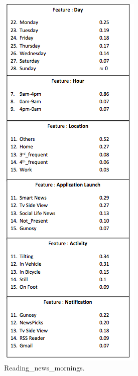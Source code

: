 \begin{figure}[t!]
\begin{subfigure}[t]{0.33\textwidth}
        \includegraphics[scale=0.51]{Figures/News.png}
        \caption{Reading\_news\_mornings.}
\label{news}
    \end{subfigure}%
  \begin{subfigure}[t]{0.33\textwidth}
        \centering

\end{subfigure}
\end{figure}
